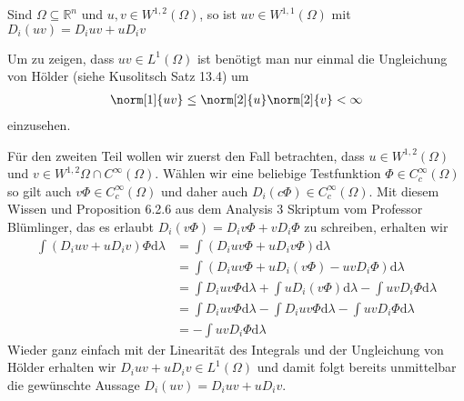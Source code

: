 \begin{exercise}

Sind $\Omega\subseteq\mathbb{R}^n$ und $u,v \in W^{1,2}(\Omega)$, so ist $uv \in W^{1,1}(\Omega)$ mit $D_i(uv) = D_iuv + uD_iv$

\end{exercise}

\begin{solution}
Um zu zeigen, dass $uv\in L^1(\Omega)$ ist benötigt man nur einmal die Ungleichung von Hölder (siehe Kusolitsch Satz 13.4) um 
\begin{align*}
    \norm[1]{uv}\leq\norm[2]{u}\norm[2]{v}<\infty
\end{align*}
einzusehen.

Für den zweiten Teil wollen wir zuerst den Fall betrachten, dass $u\in W^{1,2}(\Omega)$ und $v\in W^{1,2}\Omega\cap C^\infty(\Omega)$. Wählen wir eine beliebige Testfunktion $\Phi\in C_c^\infty(\Omega)$ so gilt auch $v\Phi\in C_c^\infty(\Omega)$ und daher auch $D_i(c\Phi)\in C_c^\infty(\Omega)$. Mit diesem Wissen und Proposition 6.2.6 aus dem Analysis 3 Skriptum vom Professor Blümlinger, das es erlaubt $D_i(v\Phi)=D_iv\Phi+vD_i\Phi$ zu schreiben, erhalten wir
\begin{align*}
    \int(D_iuv+uD_iv)\Phi\mathrm{d}\lambda&=\int(D_iuv\Phi+uD_iv\Phi)\mathrm{d}\lambda\\
    &=\int(D_iuv\Phi+uD_i(v\Phi)-uvD_i\Phi)\mathrm{d}\lambda\\
    &=\int D_iuv\Phi\mathrm{d}\lambda+\int uD_i(v\Phi)\mathrm{d}\lambda-\int uvD_i\Phi\mathrm{d}\lambda\\
    &=\int D_iuv\Phi\mathrm{d}\lambda-\int D_iuv\Phi\mathrm{d}\lambda-\int uvD_i\Phi \mathrm{d}\lambda\\
    &=-\int uvD_i\Phi \mathrm{d}\lambda
\end{align*}
Wieder ganz einfach mit der Linearität des Integrals und der Ungleichung von Hölder erhalten wir $D_iuv+uD_iv\in L^1(\Omega)$ und damit folgt bereits unmittelbar die gewünschte Aussage $D_i(uv)=D_iuv+uD_iv$.


\end{solution}
